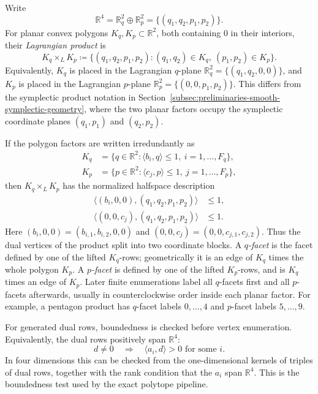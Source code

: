 \begin{definition}
\label{def:preliminaries-lagrangian-product}
Write
\[
  \mathbb{R}^4=\mathbb{R}^2_q\oplus\mathbb{R}^2_p
  =
  \{(q_1,q_2,p_1,p_2)\}.
\]
For planar convex polygons \(K_q,K_p\subset\mathbb{R}^2\), both containing
\(0\) in their interiors, their \emph{Lagrangian product} is
\begin{equation}\label{eq:preliminaries-lagrangian-product}
  K_q\times_L K_p
  \coloneqq
  \{(q_1,q_2,p_1,p_2):(q_1,q_2)\in K_q,\ (p_1,p_2)\in K_p\}.
\end{equation}
Equivalently, \(K_q\) is placed in the Lagrangian \(q\)-plane
\(\mathbb{R}^2_q=\{(q_1,q_2,0,0)\}\), and \(K_p\) is placed in the
Lagrangian \(p\)-plane \(\mathbb{R}^2_p=\{(0,0,p_1,p_2)\}\). This differs
from the symplectic product notation in
Section~\ref{subsec:preliminaries-smooth-symplectic-geometry}, where the two
planar factors occupy the symplectic coordinate planes \((q_1,p_1)\) and
\((q_2,p_2)\).

If the polygon factors are written irredundantly as
\begin{align*}
  K_q&=\{q\in\mathbb{R}^2:\langle b_i,q\rangle\leq1,\ i=1,\ldots,F_q\},\\
  K_p&=\{p\in\mathbb{R}^2:\langle c_j,p\rangle\leq1,\ j=1,\ldots,F_p\},
\end{align*}
then \(K_q\times_L K_p\) has the normalized halfspace description
\begin{align*}
  \langle (b_i,0,0),(q_1,q_2,p_1,p_2)\rangle&\leq1,\\
  \langle (0,0,c_j),(q_1,q_2,p_1,p_2)\rangle&\leq1.
\end{align*}
Here \((b_i,0,0)=(b_{i,1},b_{i,2},0,0)\) and
\((0,0,c_j)=(0,0,c_{j,1},c_{j,2})\). Thus the dual vertices of the product
split into two coordinate blocks. A \emph{\(q\)-facet} is the facet defined by
one of the lifted \(K_q\)-rows; geometrically it is an edge of \(K_q\) times
the whole polygon \(K_p\). A \emph{\(p\)-facet} is defined by one of the lifted
\(K_p\)-rows, and is \(K_q\) times an edge of \(K_p\). Later finite
enumerations label all \(q\)-facets first and all \(p\)-facets afterwards,
usually in counterclockwise order inside each planar factor. For example, a
pentagon product has \(q\)-facet labels \(0,\ldots,4\) and \(p\)-facet labels
\(5,\ldots,9\).
\end{definition}

For generated dual rows, boundedness is checked before vertex enumeration.
Equivalently, the dual rows positively span \(\mathbb{R}^4\):
\[
  d\neq0
  \quad\Longrightarrow\quad
  \langle a_i,d\rangle>0
  \text{ for some }i.
\]
In four dimensions this can be checked from the one-dimensional kernels of
triples of dual rows, together with the rank condition that the \(a_i\) span
\(\mathbb{R}^4\). This is the boundedness test used by the exact polytope
pipeline.

